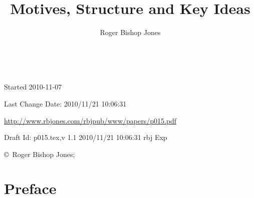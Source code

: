 \documentclass[10pt,titlepage]{book}
\title{Motives, Structure and Key Ideas}
\author{Roger Bishop Jones}
\date{\ }
\begin{document}
\frontmatter

\begin{titlepage}
\maketitle

\vfill


\begin{centering}


\vfill

\footnotesize{
Started 2010-11-07

Last Change $ $Date: 2010/11/21 10:06:31 $ $

\href{http://www.rbjones.com/rbjpub/www/papers/p015.pdf}{http://www.rbjones.com/rbjpub/www/papers/p015.pdf}

Draft $ $Id: p015.tex,v 1.1 2010/11/21 10:06:31 rbj Exp $ $

\copyright\ Roger Bishop Jones;

}%
\end{centering}

\thispagestyle{empty}
\end{titlepage}

{\parskip=0pt\tableofcontents}


\mainmatter

\section*{Preface}



\backmatter




\label{index}
\twocolumn[]
{\small\printindex}
\end{document}
